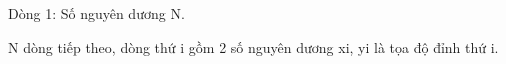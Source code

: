 Dòng 1: Số nguyên dương N.  

   N dòng tiếp theo, dòng thứ i gồm 2 số nguyên dương xi, yi là tọa độ đỉnh thứ i.